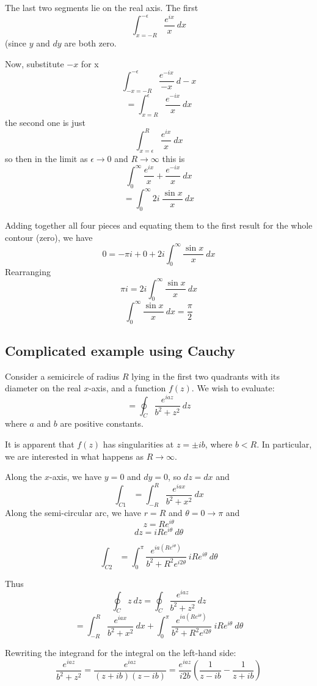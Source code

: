 \documentclass[11pt, oneside]{article}
\begin{document}
The last two segments lie on the real axis.  The first
\[ \int_{x=-R}^{-\epsilon} \frac{e^{ix}}{x} \ dx \]
(since $y$ and $dy$ are both zero.  

Now, substitute $-x$ for x
\[ \int _{-x=-R}^{-\epsilon} \frac{e^{-ix}}{-x} \ d -x \]
\[ = \int _{x=R}^{\epsilon} \frac{e^{-ix}}{x} \ dx \]
the second one is just
\[ \int _{x=\epsilon}^{R} \frac{e^{ix}}{x} \ dx \]
so then in the limit as $\epsilon \rightarrow 0$ and $R \rightarrow \infty$ this is
\[ \int_0^{\infty} \frac{e^{ix}}{x} + \frac{e^{-ix}}{x} \ dx \]
\[ =  \int_0^{\infty} 2i \ \frac{\sin x}{x} \ dx \]

Adding together all four pieces and equating them to the first result for the whole contour (zero), we have
\[ 0 =  -\pi i + 0 + 2i \int_0^{\infty} \frac{\sin x}{x} \ dx  \]
Rearranging 
\[ \pi i = 2i \int_0^{\infty} \frac{\sin x}{x} \ dx  \]
\[  \int_0^{\infty} \frac{\sin x}{x} \ dx = \frac{\pi}{2}  \]

\subsection*{Complicated example using Cauchy}

Consider a semicircle of radius $R$ lying in the first two quadrants with its diameter on the real $x$-axis, and a function $f(z)$.   We wish to evaluate:
\[ = \oint_C \frac{e^{iaz}}{b^2 + z^2} \ dz \]
where $a$ and $b$ are positive constants.

It is apparent that $f(z)$ has singularities at $z = \pm ib$, where $b < R$.  In particular, we are interested in what happens as $R \rightarrow \infty$.

Along the $x$-axis, we have $y=0$ and $dy = 0$, so $dz = dx$ and
\[ \int_{C1} = \int_{-R}^R \frac{e^{iax}}{b^2 + x^2} \ dx \]
Along the semi-circular arc, we have $r = R$ and $\theta = 0 \rightarrow \pi$ and
\[ z = Re^{i\theta} \]
\[ dz = iRe^{i\theta} \ d \theta \]

\[ \int_{C2} = \int_0^{\pi}  \frac{e^{ia(Re^{i\theta})}}{b^2 + R^2e^{i2\theta}}  \ iRe^{i\theta} \ d \theta \]

Thus
\[ \oint_C z \ dz = \oint_C \frac{e^{iaz}}{b^2 + z^2} \ dz \]
\[ = \int_{-R}^R \frac{e^{iax}}{b^2 + x^2} \ dx + \int_0^{\pi}  \frac{e^{ia(Re^{i\theta})}}{b^2 + R^2e^{i2\theta}}  \ iRe^{i\theta} \ d \theta \]

Rewriting the integrand for the integral on the left-hand side:
\[ \frac{e^{iaz}}{b^2 + z^2} = \frac{e^{iaz}}{(z + ib)(z - ib)} = \frac{e^{iaz}}{i2b} ( \frac{1}{z-ib} - \frac{1}{z+ib}) \]
\end{document}
